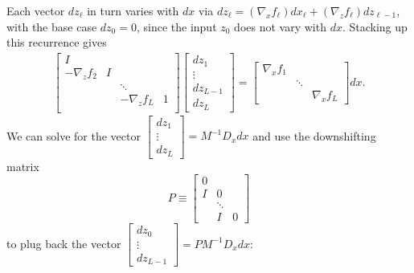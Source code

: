 \documentclass{article}
\begin{document}
Each vector $dz_\ell$ in turn varies with $dx$ via $dz_\ell = (\nabla_x f_\ell) dx_\ell + (\nabla_z f_\ell)
  dz_{\ell-1}$, with the base case $dz_0 = 0$, since the input $z_0$ does not vary with $dx$. Stacking up this recurrence
gives
\begin{align}
  \begin{bmatrix}
    I             &   &                   \\
    -\nabla_z f_2 & I &                   \\
                  &   & \ddots            \\
                  &   & -\nabla_z f_L & 1 \\
  \end{bmatrix}
  \begin{bmatrix}
    dz_1 \\ \vdots \\ dz_{L-1}  \\ dz_L
  \end{bmatrix}
  =
  \begin{bmatrix}
    \nabla_x f_1 &        &              \\
                 & \ddots &              \\
                 &        & \nabla_x f_L
  \end{bmatrix}
  dx.
\end{align}
We can solve for the vector $
  \begin{bmatrix}
    dz_1 \\ \vdots \\ dz_L
  \end{bmatrix}
  = M^{-1} D_x dx$ and use the downshifting matrix
\begin{equation}
  \label{eq:P}
  P \equiv
  \begin{bmatrix}
    0 \\ I & 0 \\ &\ddots \\ &I&0
  \end{bmatrix}
\end{equation}
to plug back the vector $
  \begin{bmatrix}
    dz_0 \\ \vdots \\ dz_{L-1}
  \end{bmatrix}
  =PM^{-1}D_x dx$:
\end{document}
